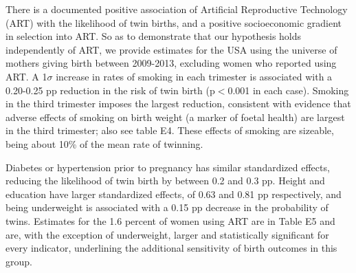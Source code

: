 \documentclass{nature}
\begin{document}
\begin{linenumbers}
There is a documented positive association of Artificial Reproductive Technology (ART) with the likelihood of twin births\cite{Vitthalaetal2009}, and a positive socioeconomic gradient in selection into ART. So as to demonstrate that our hypothesis holds independently of ART, we provide estimates for the USA using the universe of mothers giving birth between 2009-2013, excluding women who reported using ART. A 1$\sigma$ increase in rates of smoking in each trimester is associated with a 0.20-0.25 pp reduction in the risk of twin birth (p$<$0.001 in each case). Smoking in the third trimester imposes the largest reduction, consistent with evidence that adverse effects of smoking on birth weight (a marker of foetal health) are largest in the third trimester\cite{Bernsteinetal2005}; also see table E4.  %
These effects of smoking are sizeable, being about 10\% of the mean rate of twinning. 

Diabetes or hypertension prior to pregnancy has similar standardized effects, reducing the likelihood of twin birth by between 0.2 and 0.3 pp. Height and education have larger standardized effects, of 0.63 and 0.81 pp respectively, and being underweight is associated with a 0.15 pp decrease in the probability of twins. Estimates for the 1.6 percent of women using ART are in Table E5 and are, with the exception of underweight, larger and statistically significant for every indicator, underlining the additional sensitivity of birth outcomes in this group.





\end{linenumbers}
\end{document}
